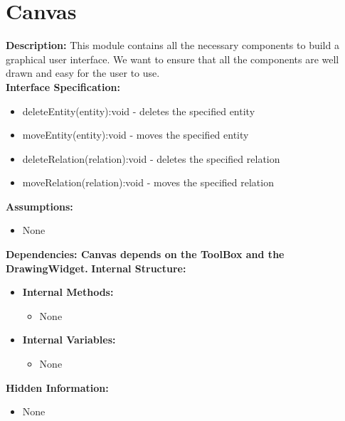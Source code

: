 \chapter{Canvas}
\textbf{Description:} This module contains all the necessary components to build a graphical user interface. We want to ensure that all the components are well drawn and easy for the user to use. \\
\textbf{Interface Specification:}
\begin{itemize}
\item{deleteEntity(entity):void - deletes the specified entity}
\item{moveEntity(entity):void - moves the specified entity}
\item{deleteRelation(relation):void - deletes the specified relation}
\item{moveRelation(relation):void - moves the specified relation}
\end{itemize}
\textbf{Assumptions:}
\begin{itemize}
\item{None} 
\end{itemize}
\textbf{Dependencies: Canvas depends on the ToolBox and the DrawingWidget.}
\textbf{Internal Structure:}
\begin{itemize}
        	\item{\textbf{Internal Methods:} 
        	\begin{itemize}
        	\item{None}
        	\end{itemize}}
        	\item{\textbf{Internal Variables:} 
        	\begin{itemize}
        	\item{None}
        	\end{itemize}}
\end{itemize}
\textbf{Hidden Information:}
\begin{itemize}
\item{None} 
\end{itemize}

